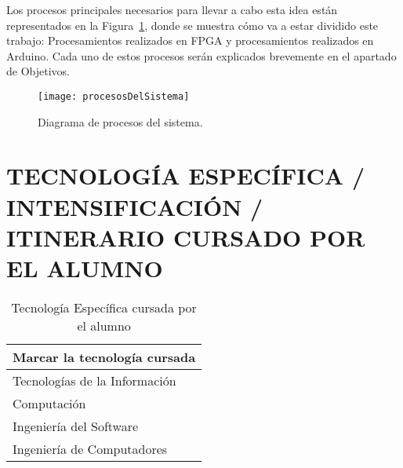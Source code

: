 \documentclass{pre-tfg}
\begin{document}


Los procesos principales necesarios para llevar a cabo esta idea están representados en la Figura~\ref{fig:DiagramaProcesos}, donde se muestra cómo va a estar dividido este trabajo: Procesamientos realizados en FPGA y procesamientos realizados en Arduino.
Cada uno de estos procesos serán explicados brevemente en el apartado de Objetivos.


\begin{figure}[./figures/procesosDelSistema]
\centering
\texttt{[image: procesosDelSistema]}
\caption{Diagrama de procesos del sistema.}
\label{fig:DiagramaProcesos}
\end{figure}



\section{TECNOLOGÍA ESPECÍFICA / INTENSIFICACIÓN / ITINERARIO CURSADO POR EL ALUMNO}

\begin{table}[hp]
  \centering
  \caption{Tecnología Específica cursada por el alumno}
  \label{tab:tec-especifica}

  \begin{tabular}{p{}}
    \textbf{Marcar la tecnología cursada} \\
    \hline
    Tecnologías de la Información \\
    Computación \\
    Ingeniería del Software \\
    \textcolor[rgb]{0.5,0.0,0.0}{Ingeniería de Computadores} \\
    \hline
  \end{tabular}
\end{table}


\clearpage
\end{document}
